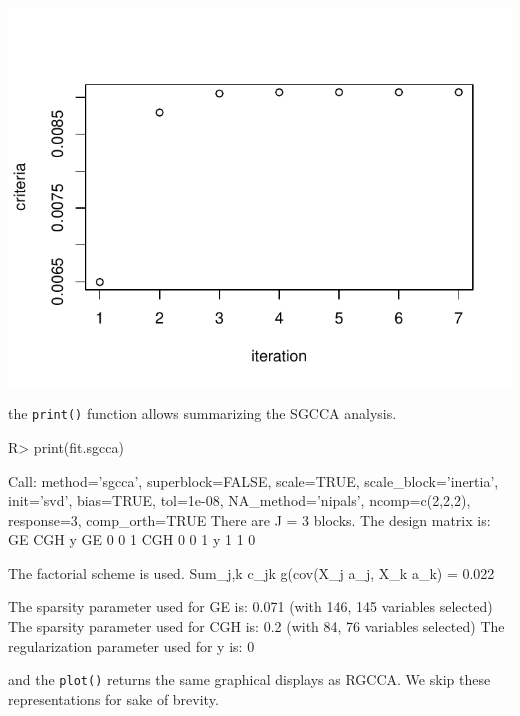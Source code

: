 \documentclass[
]{jss}
\begin{document}
\begin{CodeChunk}
\begin{center}\includegraphics{RGCCA_vignette_files/figure-latex/unnamed-chunk-38-2} \end{center}

\end{CodeChunk}

\normalsize

the \texttt{print()} function allows summarizing the SGCCA analysis.

\footnotesize

\begin{CodeChunk}
\begin{CodeInput}
R> print(fit.sgcca)
\end{CodeInput}
\begin{CodeOutput}
Call: method='sgcca', superblock=FALSE, scale=TRUE, scale_block='inertia',
init='svd', bias=TRUE, tol=1e-08, NA_method='nipals', ncomp=c(2,2,2),
response=3, comp_orth=TRUE 
There are J = 3 blocks.
The design matrix is:
    GE CGH y
GE   0   0 1
CGH  0   0 1
y    1   1 0

The factorial scheme is used.
Sum_{j,k} c_jk g(cov(X_j a_j, X_k a_k) = 0.022 

The sparsity parameter used for GE is: 0.071 (with 146, 145 variables selected)
The sparsity parameter used for CGH is: 0.2 (with 84, 76 variables selected)
The regularization parameter used for y is: 0
\end{CodeOutput}
\end{CodeChunk}

\normalsize

and the \texttt{plot()} returns the same graphical displays as RGCCA. We
skip these representations for sake of brevity.
\end{document}
